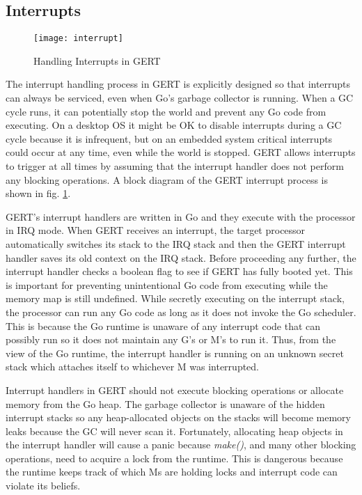 \subsection{Interrupts}
\begin{figure}[h]
\begin{center}
  \texttt{[image: interrupt]}
\end{center}
  \caption{Handling Interrupts in GERT} \label{fig:interrupt}
\end{figure}

The interrupt handling process in GERT is explicitly designed so
that interrupts can always be serviced, even when Go's garbage collector
is running. When a GC cycle runs, it can potentially stop the world and
prevent any Go code from executing. On a desktop OS it might be OK to disable
interrupts during a GC cycle because it is infrequent, but on an embedded system
critical interrupts could occur at any time, even while the world is
stopped. GERT allows interrupts to trigger at all times by assuming that the
interrupt handler does not perform any blocking operations. A block diagram
of the GERT interrupt process is shown in fig. \ref{fig:interrupt}.

GERT's interrupt handlers are written in Go and they execute with the processor
in IRQ mode. When GERT receives an interrupt, the target processor
automatically switches its stack to the IRQ stack and then the GERT interrupt handler saves its old context on the IRQ stack.
Before proceeding any further, the interrupt handler checks a boolean flag to see if GERT has fully booted yet. This is important
for preventing unintentional Go code from executing while the memory map is still undefined.
While secretly executing on the interrupt stack, the processor can run any Go code
as long as it does not invoke the Go scheduler. This is because the Go runtime is unaware
of any interrupt code that can possibly run so it does not maintain any G's or M's to
run it. Thus, from the view of the Go runtime, the interrupt handler is running on an unknown secret stack which attaches itself
to whichever M was interrupted.

Interrupt handlers in GERT should not execute blocking operations or allocate memory from the Go heap.
The garbage collector is unaware of the hidden interrupt stacks so any heap-allocated objects on the stacks
will become memory leaks because the GC will never scan it. Fortunately, allocating heap objects in the interrupt
handler will cause a panic because \textit{make()}, and many other blocking operations, need to acquire
a lock from the runtime. This is dangerous because the runtime keeps track of which Ms are holding locks
and interrupt code can violate its beliefs.


